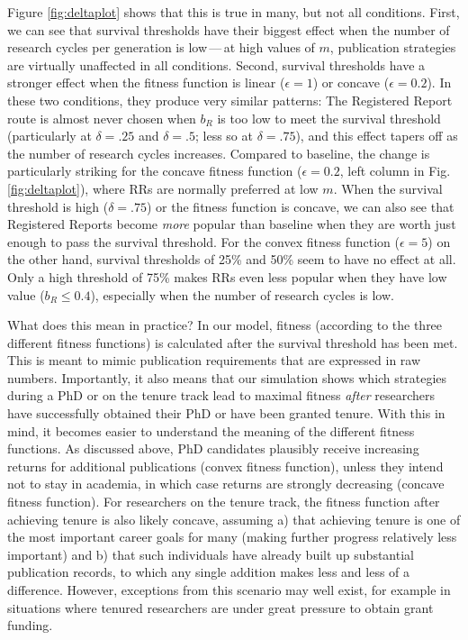\documentclass[
  british,
  a4paper,
  ,man,mask,floatsintext]{apa6}
\begin{document}
Figure \ref{fig:deltaplot} shows that this is true in many, but not all conditions.
First, we can see that survival thresholds have their biggest effect when the number of research cycles per generation is low\(\,\)---\(\,\)at high values of \(m\), publication strategies are virtually unaffected in all conditions.
Second, survival thresholds have a stronger effect when the fitness function is linear (\(\epsilon = 1\)) or concave (\(\epsilon = 0.2\)).
In these two conditions, they produce very similar patterns:
The Registered Report route is almost never chosen when \(b_{R}\) is too low to meet the survival threshold (particularly at \(\delta = .25\) and \(\delta = .5\); less so at \(\delta = .75\)), and this effect tapers off as the number of research cycles increases.
Compared to baseline, the change is particularly striking for the concave fitness function (\(\epsilon = 0.2\), left column in Fig. \ref{fig:deltaplot}), where RRs are normally preferred at low \(m\).
When the survival threshold is high (\(\delta = .75\)) or the fitness function is concave, we can also see that Registered Reports become \emph{more} popular than baseline when they are worth just enough to pass the survival threshold.
For the convex fitness function (\(\epsilon = 5\)) on the other hand, survival thresholds of 25\% and 50\% seem to have no effect at all.
Only a high threshold of 75\% makes RRs even less popular when they have low value (\(b_{R}\leq 0.4\)), especially when the number of research cycles is low.

What does this mean in practice?
In our model, fitness (according to the three different fitness functions) is calculated after the survival threshold has been met.
This is meant to mimic publication requirements that are expressed in raw numbers.
Importantly, it also means that our simulation shows which strategies during a PhD or on the tenure track lead to maximal fitness \emph{after} researchers have successfully obtained their PhD or have been granted tenure.
With this in mind, it becomes easier to understand the meaning of the different fitness functions.
As discussed above, PhD candidates plausibly receive increasing returns for additional publications (convex fitness function), unless they intend not to stay in academia, in which case returns are strongly decreasing (concave fitness function).
For researchers on the tenure track, the fitness function after achieving tenure is also likely concave, assuming a) that achieving tenure is one of the most important career goals for many (making further progress relatively less important) and b) that such individuals have already built up substantial publication records, to which any single addition makes less and less of a difference.
However, exceptions from this scenario may well exist, for example in situations where tenured researchers are under great pressure to obtain grant funding.
\end{document}
